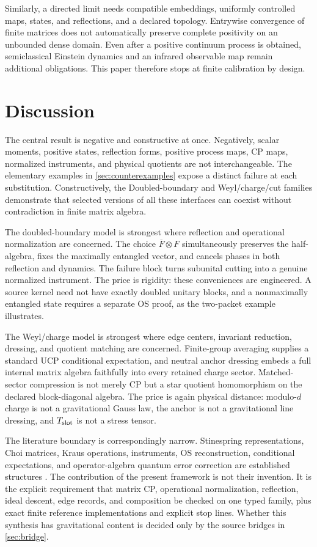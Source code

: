 \documentclass[11pt,a4paper]{article}
\theoremstyle{definition}
\theoremstyle{remark}
\begin{document}
Similarly, a directed limit needs compatible embeddings, uniformly controlled maps,
states, and reflections, and a declared topology.  Entrywise convergence of finite
matrices does not automatically preserve complete positivity on an unbounded dense
domain.  Even after a positive continuum process is obtained, semiclassical Einstein
dynamics and an infrared observable map remain additional obligations.  This paper
therefore stops at finite calibration by design.

\section{Discussion}

The central result is negative and constructive at once.  Negatively, scalar moments,
positive states, reflection forms, positive process maps, CP maps, normalized
instruments, and physical quotients are not interchangeable.  The elementary examples
in \cref{sec:counterexamples} expose a distinct failure at each substitution.
Constructively, the Doubled-boundary and Weyl/charge/cut families demonstrate that selected versions of
all these interfaces can coexist without contradiction in finite matrix algebra.

The doubled-boundary model is strongest where reflection and operational normalization
are concerned.  The choice $\overline F\otimes F$ simultaneously preserves the
half-algebra, fixes the maximally entangled vector, and cancels phases in both reflection
and dynamics.  The failure block turns subunital cutting into a genuine normalized
instrument.  The price is rigidity: these conveniences are engineered.  A source
kernel need not have exactly doubled unitary blocks, and a nonmaximally entangled state
requires a separate OS proof, as the two-packet example illustrates.

The Weyl/charge model is strongest where edge centers, invariant reduction, dressing,
and quotient matching are concerned.  Finite-group averaging supplies a standard UCP
conditional expectation, and neutral anchor dressing embeds a full internal matrix
algebra faithfully into every retained charge sector.  Matched-sector compression is
not merely CP but a star quotient homomorphism on the declared block-diagonal algebra.
The price is again physical distance: modulo-$d$ charge is not a gravitational Gauss
law, the anchor is not a gravitational line dressing, and $T_{\rm slot}$ is not a stress
tensor.

The literature boundary is correspondingly narrow.  Stinespring representations,
Choi matrices, Kraus operations, instruments, OS reconstruction, conditional
expectations, and operator-algebra quantum error correction are established structures
\cite{Stinespring1955,Choi1975,DaviesLewis1970,OsterwalderSchrader1973,BenyKempfKribs2007}.
The contribution of the present framework is not their invention.  It is the explicit
requirement that matrix CP, operational normalization, reflection, ideal descent, edge
records, and composition be checked on one typed family, plus exact finite reference
implementations and explicit stop lines.  Whether this synthesis has gravitational
content is decided only by the source bridges in \cref{sec:bridge}.
\end{document}
